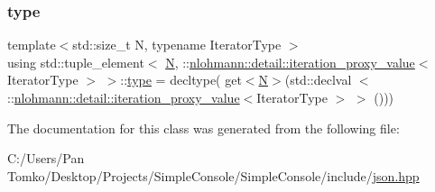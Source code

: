 \subsubsection{\texorpdfstring{type}{type}}
{\footnotesize\ttfamily template$<$std\+::size\+\_\+t N, typename Iterator\+Type $>$ \\
using std\+::tuple\+\_\+element$<$ \mbox{\hyperlink{_keyboard_event_8h_a8cc2e7240164328fdc3f0e5e21032c56}{N}}, \+::\mbox{\hyperlink{classnlohmann_1_1detail_1_1iteration__proxy__value}{nlohmann\+::detail\+::iteration\+\_\+proxy\+\_\+value}}$<$ Iterator\+Type $>$ $>$\+::\mbox{\hyperlink{classstd_1_1tuple__element_3_01_n_00_01_1_1nlohmann_1_1detail_1_1iteration__proxy__value_3_01_iterator_type_01_4_01_4_ace1dfdb74841c2f58c064a50598188fd}{type}} =  decltype( get$<$\mbox{\hyperlink{_keyboard_event_8h_a8cc2e7240164328fdc3f0e5e21032c56}{N}}$>$(std\+::declval $<$ \+::\mbox{\hyperlink{classnlohmann_1_1detail_1_1iteration__proxy__value}{nlohmann\+::detail\+::iteration\+\_\+proxy\+\_\+value}}$<$Iterator\+Type $>$ $>$ ()))}



The documentation for this class was generated from the following file\+:\begin{DoxyCompactItemize}
\item 
C\+:/\+Users/\+Pan Tomko/\+Desktop/\+Projects/\+Simple\+Console/\+Simple\+Console/include/\mbox{\hyperlink{json_8hpp}{json.\+hpp}}\end{DoxyCompactItemize}
